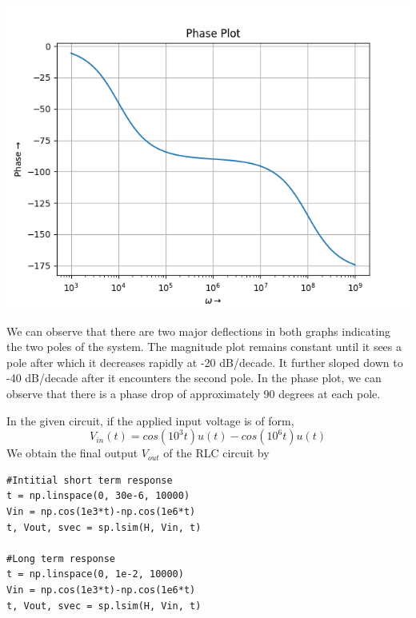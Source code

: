 \documentclass[12pt, a4paper]{report}
\begin{document}
\begin{center}
	\includegraphics[scale=0.8]{Figure_16} 
	\label{fig:rawdata}
\end{center}

We can observe that there are two major deflections in both graphs indicating the two poles of the system. The magnitude plot remains constant until it sees a pole after which it decreases rapidly at -20 dB/decade. It further sloped down to -40 dB/decade after it encounters the second pole. In the phase plot, we can observe that there is a phase drop of approximately 90 degrees at each pole.

In the given circuit, if the applied input voltage is of form, 
\begin{equation*}
V_{in}(t) = cos(10^3t)u(t) - cos(10^6t)u(t)
\end{equation*}
We obtain the final output $V_{out}$ of the RLC circuit by

\begin{verbatim}
#Intitial short term response
t = np.linspace(0, 30e-6, 10000)
Vin = np.cos(1e3*t)-np.cos(1e6*t)
t, Vout, svec = sp.lsim(H, Vin, t)

#Long term response
t = np.linspace(0, 1e-2, 10000)
Vin = np.cos(1e3*t)-np.cos(1e6*t)
t, Vout, svec = sp.lsim(H, Vin, t)
\end{verbatim}
\end{document}

